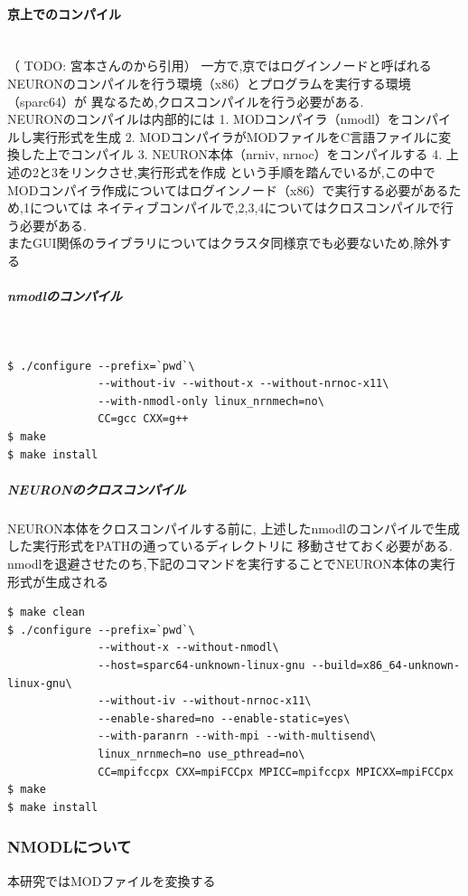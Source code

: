 \paragraph{京上でのコンパイル}~\\
（ TODO: 宮本さんのから引用）
一方で,京ではログインノードと呼ばれるNEURONのコンパイルを行う環境（x86）とプログラムを実行する環境（sparc64）が
異なるため,クロスコンパイルを行う必要がある.\\
NEURONのコンパイルは内部的には
1. MODコンパイラ（nmodl）をコンパイルし実行形式を生成
2. MODコンパイラがMODファイルをC言語ファイルに変換した上でコンパイル
3. NEURON本体（nrniv, nrnoc）をコンパイルする
4. 上述の2と3をリンクさせ,実行形式を作成
という手順を踏んでいるが,この中でMODコンパイラ作成についてはログインノード（x86）で実行する必要があるため,1については
ネイティブコンパイルで,2,3,4についてはクロスコンパイルで行う必要がある.\\
またGUI関係のライブラリについてはクラスタ同様京でも必要ないため,除外する\\
\subparagraph{nmodlのコンパイル}~\\
{\footnotesize
\begin{lstlisting}[caption=京でのnmodlのコンパイル,label=k-nmodl-compile,numbers=none]
$ ./configure --prefix=`pwd`\
              --without-iv --without-x --without-nrnoc-x11\
              --with-nmodl-only linux_nrnmech=no\
              CC=gcc CXX=g++
$ make
$ make install
\end{lstlisting}
}
\subparagraph{NEURONのクロスコンパイル}
NEURON本体をクロスコンパイルする前に, 上述したnmodlのコンパイルで生成した実行形式をPATHの通っているディレクトリに
移動させておく必要がある. nmodlを退避させたのち,下記のコマンドを実行することでNEURON本体の実行形式が生成される
{\footnotesize
\begin{lstlisting}[caption=京でのNEURON本体のコンパイル,label=k-neuron-compile,numbers=none]
$ make clean
$ ./configure --prefix=`pwd`\
              --without-x --without-nmodl\
              --host=sparc64-unknown-linux-gnu --build=x86_64-unknown-linux-gnu\
              --without-iv --without-nrnoc-x11\
              --enable-shared=no --enable-static=yes\
              --with-paranrn --with-mpi --with-multisend\
              linux_nrnmech=no use_pthread=no\
              CC=mpifccpx CXX=mpiFCCpx MPICC=mpifccpx MPICXX=mpiFCCpx
$ make
$ make install
\end{lstlisting}
}

\subsubsection{NMODLについて}
本研究ではMODファイルを変換する
